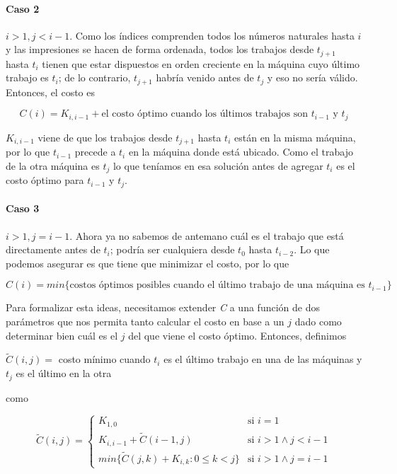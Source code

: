 \documentclass[a4paper]{report}
\begin{document}
\paragraph{Caso 2} $i>1, j<i-1$. Como los índices comprenden todos los números naturales hasta $i$ y las impresiones se hacen de forma ordenada, todos los trabajos desde $t_{j+1}$ hasta $t_{i}$ tienen que estar dispuestos en orden creciente en la máquina cuyo último trabajo es $t_{i}$; de lo contrario, $t_{j+1}$ habría venido antes de $t_{j}$ y eso no sería válido. Entonces, el costo es

$$
C(i) = K_{i,i-1} + \text{el costo óptimo cuando los últimos trabajos son } t_{i-1} \text{ y } t_{j}
$$

\medskip

$K_{i,i-1}$ viene de que los trabajos desde $t_{j+1}$ hasta $t_{i}$ están en la misma máquina, por lo que $t_{i-1}$ precede a $t_{i}$ en la máquina donde está ubicado. Como el trabajo de la otra máquina es $t_{j}$ lo que teníamos en esa solución antes de agregar $t_{i}$ es el costo óptimo para $t_{i-1}$ y $t_{j}$.

\paragraph{Caso 3} $i>1, j = i-1$. Ahora ya no sabemos de antemano cuál es el trabajo que está directamente antes de $t_{i}$; podría ser cualquiera desde $t_{0}$ hasta $t_{i-2}$. Lo que podemos asegurar es que tiene que minimizar el costo, por lo que

$$
C(i) = min\{ \text{costos óptimos posibles cuando el último trabajo de una máquina es } t_{i-1} \}
$$

\medskip

Para formalizar esta ideas, necesitamos extender \textit{C} a una función de dos parámetros que nos permita tanto calcular el costo en base a un $j$ dado como determinar bien cuál es el $j$ del que viene el costo óptimo. Entonces, definimos 

\begin{center}
    $\tilde{C}(i,j) = $ costo mínimo cuando $t_{i}$ es el último trabajo en una de las máquinas y $t_{j}$ es el último en la otra
\end{center}

como

\[
\tilde{C}(i,j) = 
\begin{cases}
K_{1,0} & \text{si } i = 1\\
K_{i,i-1} + \tilde{C}(i-1, j) & \text{si } i > 1 \land j < i-1\\
min\{ \tilde{C}(j,k) + K_{i,k} : 0 \leq k < j \} & \text{si } i > 1 \land j = i-1
\end{cases}
\]
\end{document}
